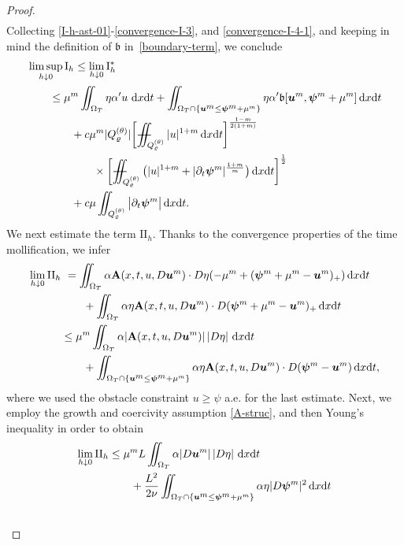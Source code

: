 \documentclass[a4paper, 10pt, american]{amsart}
\numberwithin{theorem}{section}
\numberwithin{equation}{section}
\newcommand{\dxdt}{\,\mathrm{d}x\mathrm{d}t}
\renewcommand{\rho}{\varrho}
\newcommand{\power}[2]{\bm{#1^{\mbox{\unboldmath{\scriptsize$#2$}}}}}
\def\Xiint#1{\mathchoice
    {\XXiint\displaystyle\textstyle{#1}}%
    {\XXiint\textstyle\scriptstyle{#1}}%
    {\XXiint\scriptstyle\scriptscriptstyle{#1}}%
    {\XXiint\scriptscriptstyle\scriptscriptstyle{#1}}%
    \!\iint}
\def\XXiint#1#2#3{\setbox0=\hbox{$#1{#2#3}{\iint}$}
    \vcenter{\hbox{$#2#3$}}\kern-0.5\wd0}
\def\biint{\Xiint{-\!-}}
\begin{document}
\begin{proof}
\begin{align}
\end{align}
Collecting \eqref{I-h-ast-01}-\eqref{convergence-I-3}, and
\eqref{convergence-I-4-1}, and keeping in mind the definition of
$\mathfrak b$ in~\eqref{boundary-term}, we conclude
\begin{align}\label{limsup-I-h}
  &\limsup_{h\downarrow0}\mathrm{I}_h
  \le
  \lim_{h\downarrow0}\mathrm{I}_h^\ast\\\nonumber
  &\qquad\le
  \mu^m\iint_{\Omega_T}\eta\alpha'u\,\dxdt
  +\iint_{\Omega_T\cap\{\power um \le \power \psi m +\mu^m\}}\eta\alpha'\mathfrak{b}[\power um,\power\psi
  m+\mu^m]\dxdt\\\nonumber
  &\qquad\qquad+
  c\mu^m|Q_\rho^{(\theta)}| \bigg[\biint_{Q_\rho^{(\theta)}} |u|^{1+m} \dxdt \bigg]^{\frac{1-m}{2(1+m)}}\\\nonumber
	&\qquad\qquad\qquad\times
	\bigg[\biint_{Q_\rho^{(\theta)}} \big( |u|^{1+m} + |\partial_t \power \psi {m}|^{\frac{1+m}m}\big) \dxdt\bigg]^{\frac{1}{2}} \\\nonumber
	&\qquad\qquad+
	c\mu\iint_{Q_\rho^{(\theta)}}  \big|\partial_t \power \psi m\big| \dxdt.
\end{align}
We next estimate the term $\mathrm{II}_h$. Thanks to the
convergence properties of the time mollification, we infer 
\begin{align*}
  \lim_{h\downarrow0}\mathrm{II}_h 
  &\ =
   \iint_{\Omega_T}\alpha
    \mathbf{A}(x,t,u,D\power um)\cdot D\eta (-\mu^m+(\power\psi
    m+\mu^m-\power um)_+)\dxdt\\
    &\qquad+
    \iint_{\Omega_T}\alpha
    \eta \mathbf{A}(x,t,u,D\power um)\cdot D(\power\psi m+\mu^m-\power um)_+\dxdt
   \\
  &\le
  \mu^m\iint_{\Omega_T}\alpha |\mathbf{A}(x,t,u,D\power um)|\,|D\eta|\,\dxdt\\
  &\qquad
  +
  \iint_{\Omega_T\cap\{\power um \le \power \psi m +\mu^m\}}
  \alpha\eta \mathbf{A}(x,t,u,D\power um)\cdot D(\power\psi m-\power um)\dxdt,
\end{align*}
where we used the obstacle constraint $u\ge\psi$ a.e. for the last estimate.
Next, we employ the growth and coercivity assumption \eqref{A-struc},
and then Young's inequality in order to obtain 
\begin{align}\label{convergence-II-2}
  \lim_{h\downarrow0}\mathrm{II}_h
  &\le
  \mu^mL\iint_{\Omega_T}\alpha |D\power um|\,|D\eta|\,\dxdt\\\nonumber
  &\qquad+
  \frac{L^2}{2\nu}\iint_{\Omega_T\cap\{\power um \le \power \psi m +\mu^m\}}\alpha\eta  |D\power\psi m|^2\dxdt \\\nonumber

\end{align}
\end{proof}
\end{document}
